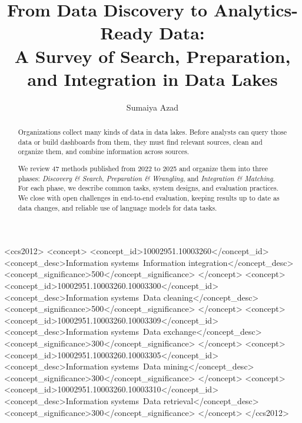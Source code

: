 \documentclass[sigconf]{acmart}
\date{}
\begin{document}
\pagestyle{plain}

\title[Survey of Data Discovery to Integration in Data Lakes]%
{From Data Discovery to Analytics-Ready Data:\\A Survey of Search, Preparation, and Integration in Data Lakes}

\author{Sumaiya Azad}

\renewcommand{\shortauthors}{Azad et al.}



\begin{abstract}
Organizations collect many kinds of data in data lakes. Before analysts can query those data or build dashboards from them, they must find relevant sources, clean and organize them, and combine information across sources.

We review 47 methods published from 2022 to 2025 and organize them into three phases: \emph{Discovery \& Search}, \emph{Preparation \& Wrangling}, and \emph{Integration \& Matching}. For each phase, we describe common tasks, system designs, and evaluation practices. We close with open challenges in end-to-end evaluation, keeping results up to date as data changes, and reliable use of language models for data tasks.
\end{abstract}

\begin{CCSXML}
<ccs2012>
 <concept>
  <concept_id>10002951.10003260</concept_id>
  <concept_desc>Information systems~Information integration</concept_desc>
  <concept_significance>500</concept_significance>
 </concept>
 <concept>
  <concept_id>10002951.10003260.10003300</concept_id>
  <concept_desc>Information systems~Data cleaning</concept_desc>
  <concept_significance>500</concept_significance>
 </concept>
 <concept>
  <concept_id>10002951.10003260.10003309</concept_id>
  <concept_desc>Information systems~Data exchange</concept_desc>
  <concept_significance>300</concept_significance>
 </concept>
 <concept>
  <concept_id>10002951.10003260.10003305</concept_id>
  <concept_desc>Information systems~Data mining</concept_desc>
  <concept_significance>300</concept_significance>
 </concept>
 <concept>
  <concept_id>10002951.10003260.10003310</concept_id>
  <concept_desc>Information systems~Data retrieval</concept_desc>
  <concept_significance>300</concept_significance>
 </concept>
</ccs2012>
\end{CCSXML}
\end{document}
